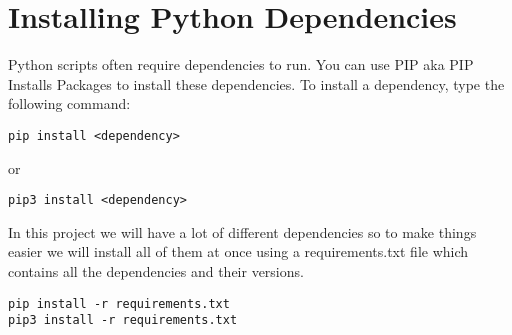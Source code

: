 \documentclass[11pt]{report}
\begin{document}
\section{Installing Python Dependencies}
Python scripts often require dependencies to run. You can use PIP aka PIP Installs Packages to install these dependencies. To install a dependency, type the following command:
\begin{verbatim}
pip install <dependency>
\end{verbatim}
or
\begin{verbatim}
pip3 install <dependency>
\end{verbatim}

In this project we will have a lot of different dependencies so to make things easier we will install all of them at once using a requirements.txt file which contains all the dependencies and their versions.
\begin{verbatim}
pip install -r requirements.txt
pip3 install -r requirements.txt
\end{verbatim}
\end{document}
